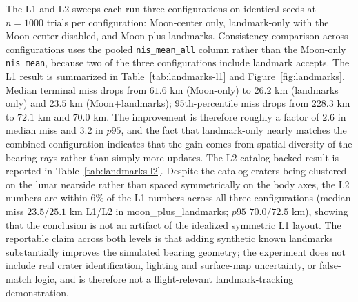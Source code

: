 \documentclass[10pt,twocolumn]{article}
\begin{document}
The L1 and L2 sweeps each run three configurations on identical seeds at $n=1000$ trials per configuration: Moon-center only, landmark-only with the Moon-center disabled, and Moon-plus-landmarks.  Consistency comparison across configurations uses the pooled \texttt{nis\_mean\_all} column rather than the Moon-only \texttt{nis\_mean}, because two of the three configurations include landmark accepts.  The L1 result is summarized in Table~\ref{tab:landmarks-l1} and Figure~\ref{fig:landmarks}.  Median terminal miss drops from $61.6$ km (Moon-only) to $26.2$ km (landmarks only) and $23.5$ km (Moon+landmarks); 95th-percentile miss drops from $228.3$ km to $72.1$ km and $70.0$ km.  The improvement is therefore roughly a factor of $2.6$ in median miss and $3.2$ in $p95$, and the fact that landmark-only nearly matches the combined configuration indicates that the gain comes from spatial diversity of the bearing rays rather than simply more updates.  The L2 catalog-backed result is reported in Table~\ref{tab:landmarks-l2}.  Despite the catalog craters being clustered on the lunar nearside rather than spaced symmetrically on the body axes, the L2 numbers are within $6\%$ of the L1 numbers across all three configurations (median miss $23.5/25.1$ km L1/L2 in moon\_plus\_landmarks; $p95$ $70.0/72.5$ km), showing that the conclusion is not an artifact of the idealized symmetric L1 layout.  The reportable claim across both levels is that adding synthetic known landmarks substantially improves the simulated bearing geometry; the experiment does not include real crater identification, lighting and surface-map uncertainty, or false-match logic, and is therefore not a flight-relevant landmark-tracking demonstration.

\begin{table}[t]
\centering
\caption{L1 synthetic-landmark configurations, $n=1000$ trials each, identical seeds across configurations.  Pooled NIS is computed over Moon-center plus accepted landmark updates.}
\label{tab:landmarks-l1}
\scriptsize
{}
\end{table}
\end{document}
